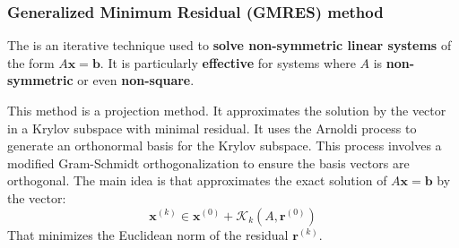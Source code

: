 \subsubsection{Generalized Minimum Residual (GMRES) method}

The  is an iterative technique used to \textbf{solve non-symmetric linear systems} of the form $A\mathbf{x} = \mathbf{b}$. It is particularly \textbf{effective} for systems where $A$ is \textbf{non-symmetric} or even \textbf{non-square}.

\highspace
This method is a projection method. It approximates the solution by the vector in a Krylov subspace with minimal residual. It uses the Arnoldi process to generate an orthonormal basis for the Krylov subspace. This process involves a modified Gram-Schmidt orthogonalization to ensure the basis vectors are orthogonal. The main idea is that approximates the exact solution of $A\mathbf{x} = \mathbf{b}$ by the vector:
\begin{equation}
    \mathbf{x}^{\left(k\right)} \in \mathbf{x}^{\left(0\right)} + \mathcal{K}_{k}\left(A, \mathbf{r}^{\left(0\right)}\right)
\end{equation}
That minimizes the Euclidean norm of the residual $\mathbf{r}^{\left(k\right)}$.

